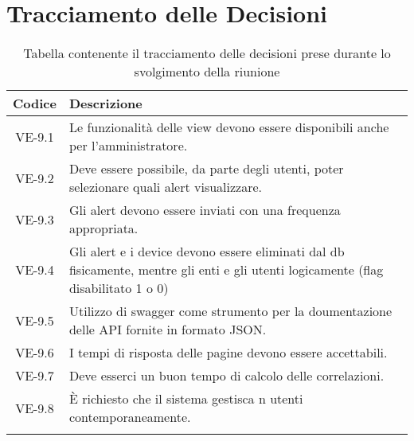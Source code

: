 \section*{Tracciamento delle Decisioni}

\begin{center}
	\begin{longtable}{|c|p{14.5cm}|}
	\hline
	\rowcolor{lighter-grayer}
	\textbf{Codice} & \textbf{Descrizione} \\
	\hline
	\endfirsthead
	
	\hline
	VE-9.1 & Le funzionalità delle view devono essere disponibili anche per l'amministratore. \\
	\hline
	VE-9.2 & Deve essere possibile, da parte degli utenti, poter selezionare quali alert visualizzare. \\
	\hline
	VE-9.3 & Gli alert devono essere inviati con una frequenza appropriata. \\
	\hline
	VE-9.4 & Gli alert e i device devono essere eliminati dal db fisicamente, mentre gli enti e gli utenti logicamente (flag disabilitato 1 o 0) \\
	\hline
	VE-9.5 & Utilizzo di swagger come strumento per la doumentazione delle API fornite in formato JSON. \\
	\hline
	VE-9.6 & I tempi di risposta delle pagine devono essere accettabili. \\
	\hline
	VE-9.7 & Deve esserci un buon tempo di calcolo delle correlazioni. \\
	\hline
	VE-9.8 & È richiesto che il sistema gestisca n utenti contemporaneamente. \\
	\hline
	\caption{Tabella contenente il tracciamento delle decisioni prese durante lo svolgimento della riunione}
	\end{longtable}
\end{center}